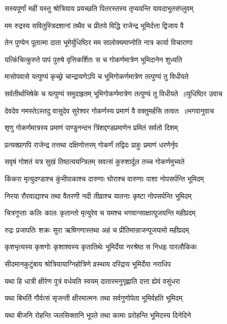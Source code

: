 \twolineshloka
{सस्यपूर्णां महीं यस्तु श्रोत्रियाय प्रयच्छति}
{पितरस्तस्य तृप्ययन्ति यावदाभूतसंप्लुवम्}


\twolineshloka
{मम रुद्रस्य सवितुस्त्रिदशानां तथैव च}
{प्रीतये विद्धि राजेन्द्र भूमिर्दत्ता द्विजाय वै}


\twolineshloka
{तेन पुण्येन पूतात्मा दाता भूमेर्युधिष्ठिर}
{मम सालोक्यमाप्नोति नात्र कार्या विचाराणा}


\twolineshloka
{यत्किंचित्कुरुते पापं पुरुषे वृत्तिकर्शितः}
{स च गोकर्णमात्रेण भूमिदानेन शुध्यति}


\twolineshloka
{मासोपवासे यत्पुण्यं कृच्छ्रे चान्द्रायणेऽपि च}
{भूमिगोकर्णमात्रेण तत्पुण्यं तु विधीयते}


\threelineshloka
{सर्वतीर्थाभिषेके च यत्पुण्यं समुदाहृतम्}
{भूमिगोकर्णमात्रेण तत्पुण्यं तु विधीयते ॥युधिष्ठिर उवाच}
{}


\threelineshloka
{देवदेव नमस्तेऽस्तदु वासुदेव सुरेश्वर}
{गोकर्णस्य प्रमाणं वै वक्तुमर्हसि तत्वतः ॥भगवानुवाच}
{}


\twolineshloka
{शृणु गोकर्णमात्रस्य प्रमाणं पाण्डुनन्दन}
{त्रिंशद्दण्डप्रमाणेन प्रमितं सर्वतो दिशम्}


\twolineshloka
{प्रत्यक्प्रागपि राजेन्द्र तत्तथा दक्षिणोत्तरम्}
{गोकर्णं तद्विदः प्राहुः प्रमाणं धरणेर्नृप}


\twolineshloka
{सवृषं गोशतं यत्र सुखं तिष्ठत्ययन्त्रितम्}
{सवत्सं कुरुशार्दूल तच्च गोकर्णमुच्यते}


\twolineshloka
{किंकरा मृत्युदण्डाश्च कुंभीपाकाश्च दारुणाः}
{घोराश्च वारुणाः पाशा नोपसर्पन्ति भूमिदम्}


\twolineshloka
{निरया रौरवाद्याश्च तथा वैतरणी नदी}
{तीव्राश्च यातनाः कृष्टा नोपसर्पन्ति भूमिदम्}


\twolineshloka
{चित्रगुप्ताः कलिः कालः कृतान्तो मृत्युरेव च}
{यमश्च भगवान्साक्षात्पूजयन्ति महीप्रदम्}


\twolineshloka
{रुद्रः प्रजापतिः शक्रः सुरा ऋषिगणास्तथा}
{अहं च प्रीतिमान्राजन्पूजयामो महीप्रदम्}


\twolineshloka
{कृशभृत्यस्य कृशगोः कृशाश्वस्य कृतातिथेः}
{भूमिर्देया नरश्रेष्ठ स निधइः पारलौकिकः}


\twolineshloka
{सीदमानकुटुंबाय श्रोत्रियायाग्निहोत्रिणे}
{व्रस्थाय दरिद्राय भूमिर्देया नराधिप}


\twolineshloka
{यथा हि धात्री क्षीरेण पुत्रं वर्धयति स्वयम्}
{दातारमनुगृह्णाति दत्ता ह्येवं वसुंधरा}


\twolineshloka
{यथा बिभर्ति गौर्वत्सं सृजन्ती क्षीरमात्मनः}
{तथा सर्वगुणोपेता भूमिर्वहति भूमिदम्}


\twolineshloka
{यथा बीजनि रोहन्ति जलसिक्तानि भूपते}
{तथा कामाः प्ररोहन्ति भूमिदस्य दिनेदिने}


